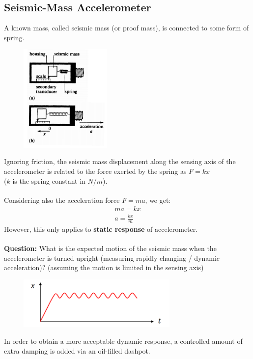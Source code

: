 \documentclass[class=report, crop=false, 12pt,a4paper]{standalone}
\begin{document}
\subsection{Seismic-Mass Accelerometer}
A known mass, called seismic mass (or proof mass), is connected to some form of spring.
\begin{figure}[H]
  \centering
  \includegraphics[width = 0.4\textwidth]{../img/Mdiagram29.png}
\end{figure}
Ignoring friction, the seismic mass displacement along the sensing axis of the accelerometer is related to the force exerted by the spring as $F = kx$ \\
($k$ is the spring constant in $N/m$). \\\\
Considering also the acceleration force $F = ma$, we get:
\begin{gather}
  ma = kx \\
  a = \frac{kx}{m}
\end{gather}
However, this only applies to \textbf{static response} of accelerometer. \\\\
\textbf{Question:} What is the expected motion of the seismic mass when the accelerometer is turned upright (measuring rapidly changing / dynamic acceleration)? (assuming the motion is limited in the sensing axis)
\begin{figure}[H]
  \centering
  \includegraphics[width = 0.7\textwidth]{../img/Mdiagram30.png}
\end{figure}
In order to obtain a more acceptable dynamic response, a controlled amount of extra damping is added via an oil-filled dashpot.
\end{document}
